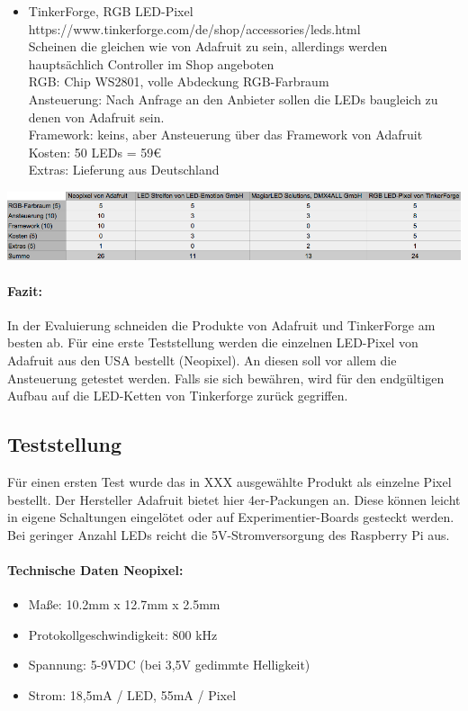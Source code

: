 \begin{itemize}
\item TinkerForge, RGB LED-Pixel \\
https://www.tinkerforge.com/de/shop/accessories/leds.html \\
Scheinen die gleichen wie von Adafruit zu sein, allerdings werden hauptsächlich Controller im Shop angeboten \\
RGB: Chip WS2801, volle Abdeckung RGB-Farbraum \\
Ansteuerung: Nach Anfrage an den Anbieter sollen die LEDs baugleich zu denen von Adafruit sein.  \\
Framework: keins, aber Ansteuerung über das Framework von Adafruit \\
Kosten: 50 LEDs = 59€ \\
Extras: Lieferung aus Deutschland
\end{itemize}
\begin{minipage}{\linewidth}
            \centering
            \includegraphics[width=\textwidth]{./data/evaluierung-led.png}
        \end{minipage}
\paragraph{Fazit:}
In der Evaluierung schneiden die Produkte von Adafruit und TinkerForge am besten ab. Für eine erste Teststellung werden die einzelnen LED-Pixel von Adafruit aus den USA bestellt (Neopixel). An diesen soll vor allem die Ansteuerung getestet werden. Falls sie sich bewähren, wird für den endgültigen Aufbau auf die LED-Ketten von Tinkerforge zurück gegriffen. 

\subsection{Teststellung}
Für einen ersten Test wurde das in XXX ausgewählte Produkt als einzelne Pixel bestellt. Der Hersteller Adafruit bietet hier 4er-Packungen an. Diese können leicht in eigene Schaltungen eingelötet oder auf Experimentier-Boards gesteckt werden. Bei geringer Anzahl LEDs reicht die 5V-Stromversorgung des Raspberry Pi aus. 
\paragraph{Technische Daten Neopixel:} 
	\begin{itemize}
	\item Maße: 10.2mm x 12.7mm x 2.5mm
	\item Protokollgeschwindigkeit: 800 kHz
	\item Spannung: 5-9VDC  (bei 3,5V gedimmte Helligkeit) 
	\item Strom: 18,5mA / LED, 55mA / Pixel
	\end{itemize}
